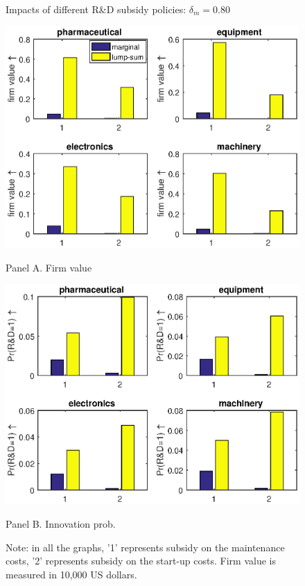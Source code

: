 \documentclass[11pt]{article}
\begin{document}
\begin{figure}[h]
    \caption{Impacts of different R\&D subsidy policies: $\delta_m=0.80$}
    \label{F6}
     \centering
    \begin{minipage}{0.48\textwidth}
        \includegraphics[width=\textwidth]{Figs/FirmvalueChange.eps}   
        \caption*{Panel A. Firm value}   
    \end{minipage}
     \hfill
     \begin{minipage}{0.48\textwidth}
         \includegraphics[width=\textwidth]{Figs/ProbChange.eps}
         \caption*{Panel B. Innovation prob.}
     \end{minipage}
    \caption*{\small{}Note: in all the graphs, '1' represents subsidy on the maintenance costs, '2' represents subsidy on the start-up costs. Firm value is measured in 10,000 US dollars.}{\small \par}
\end{figure}
\end{document}
